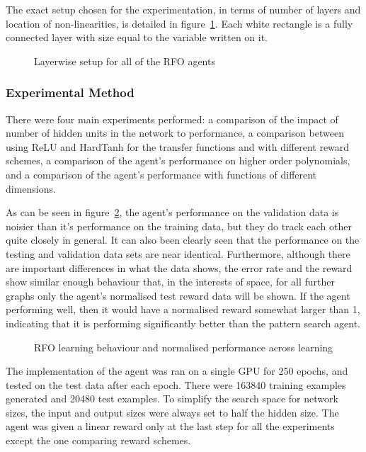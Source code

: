 The exact setup chosen for the experimentation, in terms of number of layers and location of non-linearities, is detailed in figure~\ref{fig:exactsetup}. Each white rectangle is a fully connected layer with size equal to the variable written on it. 
\begin{figure}
\centering

\caption{Layerwise setup for all of the RFO agents}
\label{fig:exactsetup}
\end{figure}


\subsubsection{Experimental Method}
There were four main experiments performed: a comparison of the impact of number of hidden units in the network to performance, a comparison between using ReLU and HardTanh for the transfer functions and with different reward schemes, a comparison of the agent's performance on higher order polynomials, and a comparison of the agent's performance with functions of different dimensions.

As can be seen in figure~\ref{fig:opt1norm}, the agent's performance on the validation data is noisier than it's performance on the training data, but they do track each other quite closely in general. It can also been clearly seen that the performance on the testing and validation data sets are near identical. Furthermore, although there are important differences in what the data shows, the error rate and the reward show similar enough behaviour that, in the interests of space, for all further graphs only the agent's normalised test reward data will be shown. If the agent performing well, then it would have a normalised reward somewhat larger than 1, indicating that it is performing significantly better than the pattern search agent.


\begin{figure}
\centering


\caption{RFO learning behaviour and normalised performance across learning}
\label{fig:opt1norm}
\end{figure}

The implementation of the agent was ran on a single GPU for 250 epochs, and tested on the test data after each epoch. There were  163840 training examples generated and 20480 test examples. To simplify the search space for network sizes, the input and output sizes were always set to half the hidden size. The agent was given a linear reward only at the last step for all the experiments except the one comparing reward schemes.


